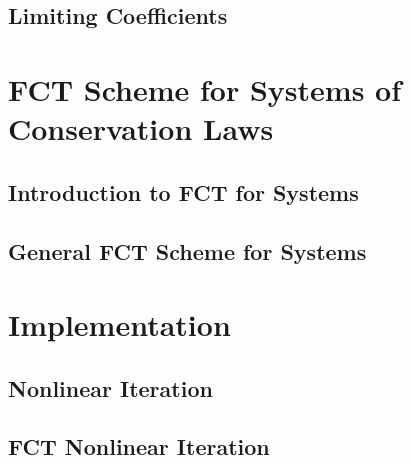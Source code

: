 \subsection{Limiting Coefficients\label{sec:limiting_coefficients_scalar}}
  
\section{FCT Scheme for Systems of Conservation Laws\label{sec:fct_systems}}
\subsection{Introduction to FCT for Systems\label{sec:fct_systems_introduction}}
  
\subsection{General FCT Scheme for Systems\label{sec:fct_systems_scheme}}
  
\section{Implementation\label{sec:implementation}}
\subsection{Nonlinear Iteration\label{sec:nonlinear_iteration}}
  
\subsection{FCT Nonlinear Iteration
  \label{sec:fct_nonlinear_iteration}}
  
%  

